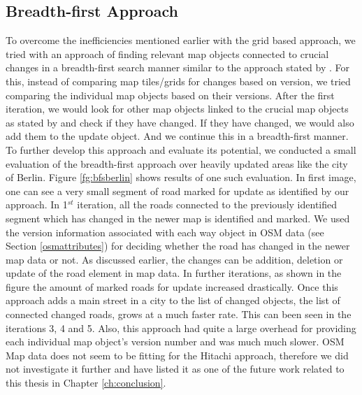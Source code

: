 \subsection{Breadth-first Approach}
To overcome the inefficiencies mentioned earlier with the grid based approach, we tried with an approach of finding relevant map objects connected to crucial changes in a breadth-first search manner similar to the approach stated by \citet{hitachi}. For this, instead of comparing map tiles/grids for changes based on version, we tried comparing the individual map objects based on their versions. After the first iteration, we would look for other map objects linked to the crucial map objects as stated by \citet{hitachi} and check if they have changed. If they have changed, we would also add them to the update object. And we continue this in a breadth-first manner. To further develop this approach and evaluate its potential, we conducted a small evaluation of the breadth-first approach over heavily updated areas like the city of Berlin. Figure \ref{fg:bfsberlin} shows results of one such evaluation. In first image, one can see a very small segment of road marked for update as identified by our approach. In 1$^{st}$ iteration, all the roads connected to the previously identified segment which has changed in the newer map is identified and marked. We used the version information associated with each way object in OSM data (see Section \ref{osmattributes}) for deciding whether the road has changed in the newer map data or not. As discussed earlier, the changes can be addition, deletion or update of the road element in map data. In further iterations, as shown in the figure the amount of marked roads for update increased drastically. Once this approach adds a main street in a city to the list of changed objects, the list of connected changed roads, grows at a much faster rate. This can been seen in the iterations 3, 4 and 5. Also, this approach had quite a large overhead for providing each individual map object's version number and was much much slower. OSM Map data does not seem to be fitting for the Hitachi approach, therefore we did not investigate it further and have listed it as one of the future work related to this thesis in Chapter \ref{ch:conclusion}.   




